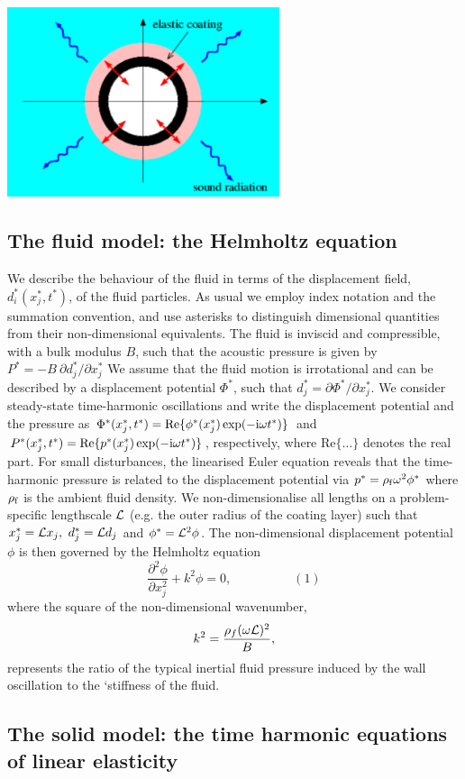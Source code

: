  
\begin{DoxyImage}
\includegraphics[width=0.6\textwidth]{coated_pipe}
\end{DoxyImage}
\hypertarget{index_fluid}{}\subsection{The fluid model\+: the Helmholtz equation}\label{index_fluid}
We describe the behaviour of the fluid in terms of the displacement field, $ d_i^*(x_j^*,t^*)$, of the fluid particles. As usual we employ index notation and the summation convention, and use asterisks to distinguish dimensional quantities from their non-\/dimensional equivalents. The fluid is inviscid and compressible, with a bulk modulus $ B $, such that the acoustic pressure is given by $ P^* = - B \ \partial d_j^*/\partial x_j^* $ We assume that the fluid motion is irrotational and can be described by a displacement potential $\Phi^*$, such that $ d^*_j = \partial \Phi^*/\partial x_j^*. $ We consider steady-\/state time-\/harmonic oscillations and write the displacement potential and the pressure as $\Phi^*(x_j^*,t^*) = \mbox{Re} \{\phi^*(x_j^*) \exp(-{\rm i} \omega t^*)\} $ and $P^*(x_j^*,t^*) = \mbox{Re}\{p^*(x_j^*) \exp(-{\rm i} \omega t^*)\}$, respectively, where $\mbox{Re}\{\ldots \}$ denotes the real part. For small disturbances, the linearised Euler equation reveals that the time-\/harmonic pressure is related to the displacement potential via $ p^* = \rho_{\rm f} \omega^2 \phi^*$ where $ \rho_{\rm f} $ is the ambient fluid density. We non-\/dimensionalise all lengths on a problem-\/specific lengthscale $ {\cal L}$ (e.\+g. the outer radius of the coating layer) such that $x_j^* = {\cal L} x_j,\ d_j^* = {\cal L} d_j$ and $\phi^* = {\cal L}^2 \phi$. The non-\/dimensional displacement potential $\phi$ is then governed by the Helmholtz equation \[ \frac{\partial^2 \phi}{\partial x_j^{2}} + k^2 \phi = 0, \ \ \ \ \ \ \ \ \ \ \ \ \ \ \ \ \ \ \ \ \ \ (1) \] where the square of the non-\/dimensional wavenumber, \[ k^2 = \frac{\rho_f (\omega {\cal L})^2}{B}, \] represents the ratio of the typical inertial fluid pressure induced by the wall oscillation to the `stiffness\textquotesingle{} of the fluid.\hypertarget{index_elastic}{}\subsection{The solid model\+: the time harmonic equations of linear elasticity}\label{index_elastic}
